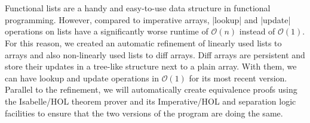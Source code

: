 \chapter{\abstractname}

Functional lists are a handy and easy-to-use data structure in functional programming. However, compared to imperative arrays, |lookup| and |update| operations on lists have a significantly worse runtime of $\mathcal{O}(n)$ instead of $\mathcal{O}(1)$. For this reason, we created an automatic refinement of linearly used lists to arrays and also non-linearly used lists to diff arrays. Diff arrays are persistent and store their updates in a tree-like structure next to a plain array. With them, we can have lookup and update operations in $\mathcal{O}(1)$ for its most recent version.\\
Parallel to the refinement, we will automatically create equivalence proofs using the Isabelle/HOL theorem prover and its Imperative/HOL and separation logic facilities to ensure that the two versions of the program are doing the same. 
